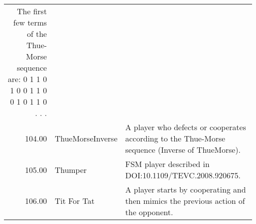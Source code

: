 \begin{table}[!hbtp]
\begin{adjustbox}{width=2\textwidth, angle=90}
\begin{tabular}{rll}
	The first few terms of the Thue-Morse sequence are:
	0 1 1 0 1 0 0 1 1 0 0 1 0 1 1 0 . . .                                                                                                                                                                                                                                                                                                                                                                                                                                                                                                                                                                                                                                                                                                                                                                                                                                              \\
	104.00 & ThueMorseInverse            & A player who defects or cooperates according to the Thue-Morse sequence
	(Inverse of ThueMorse).                                                                                                                                                                                                                                                                                                                                                                                                                                                                                                                                                                                                                                                                                                                                                                                                                                                                                                                      \\
	105.00 & Thumper                     & FSM player described in DOI:10.1109/TEVC.2008.920675.                                                                             \\
	106.00 & Tit For Tat                 & A player starts by cooperating and then mimics the previous action of the
	opponent.


\end{tabular}
\end{adjustbox}
\end{table}
